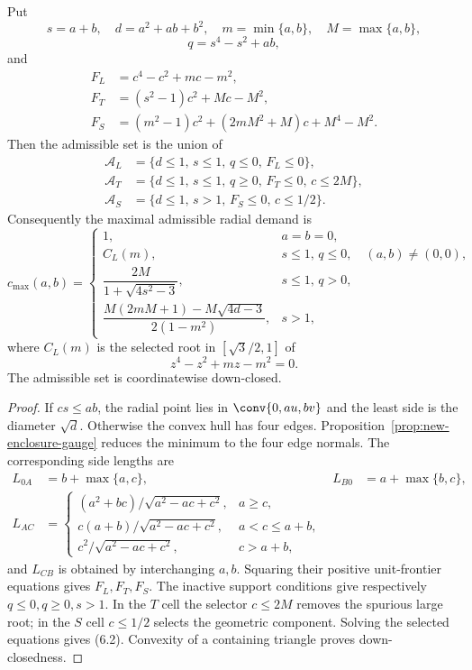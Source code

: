 \begin{proposition}
\label{prop:new-exact-local-set}
\label{prop:exact-admissible-set}
Put
\[
 s=a+b,\quad d=a^2+ab+b^2,\quad
 m=\min\{a,b\},\quad M=\max\{a,b\},
\]
\[
 q=s^4-s^2+ab,
\]
and
\begin{align*}
 F_L&=c^4-c^2+mc-m^2,\\
 F_T&=(s^2-1)c^2+Mc-M^2,\\
 F_S&=(m^2-1)c^2+(2mM^2+M)c+M^4-M^2.
\end{align*}
Then the admissible set is the union of
\begin{align*}
 \mathcal A_L&=\{d\le1,\,s\le1,\,q\le0,\,F_L\le0\},\\
 \mathcal A_T&=\{d\le1,\,s\le1,\,q\ge0,\,F_T\le0,\,c\le2M\},\\
 \mathcal A_S&=\{d\le1,\,s>1,\,F_S\le0,\,c\le1/2\}.
\end{align*}
Consequently the maximal admissible radial demand is
\[
 c_{\max}(a,b)=
 \begin{cases}
  1,&a=b=0,\\
  C_L(m),&s\le1,\,q\le0,
  \quad (a,b)\ne(0,0),\\
  \dfrac{2M}{1+\sqrt{4s^2-3}},&s\le1,\,q>0,\\[3mm]
  \dfrac{M(2mM+1)-M\sqrt{4d-3}}{2(1-m^2)},&s>1,
 \end{cases}
 \label{eq:radial-envelope}
 \tag{6.2}
\]
where $C_L(m)$ is the selected root in $[\sqrt3/2,1]$ of
\[
 z^4-z^2+mz-m^2=0.
\]
The admissible set is coordinatewise down-closed.
\end{proposition}

\begin{proof}
If $cs\le ab$, the radial point lies in $\conv\{0,au,bv\}$ and the least
side is the diameter $\sqrt d$.  Otherwise the convex hull has four edges.
Proposition~\ref{prop:new-enclosure-gauge} reduces the minimum to the four
edge normals.  The corresponding side lengths are
\begin{align*}
 L_{0A}&=b+\max\{a,c\},&
 L_{B0}&=a+\max\{b,c\},\\
 L_{AC}&=
 \begin{cases}
 (a^2+bc)/\sqrt{a^2-ac+c^2},&a\ge c,\\
 c(a+b)/\sqrt{a^2-ac+c^2},&a<c\le a+b,\\
 c^2/\sqrt{a^2-ac+c^2},&c>a+b,
 \end{cases}
\end{align*}
and $L_{CB}$ is obtained by interchanging $a,b$.  Squaring their positive
unit-frontier equations gives $F_L,F_T,F_S$.  The inactive support conditions
give respectively $q\le0,q\ge0,s>1$.  In the $T$ cell the selector
$c\le2M$ removes the spurious large root; in the $S$ cell $c\le1/2$ selects
the geometric component.  Solving the selected equations gives (6.2).
Convexity of a containing triangle proves down-closedness.
\end{proof}

